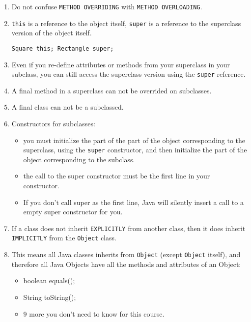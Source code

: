 \documentclass[a4paper, 9pt]{extarticle}
\begin{document}
\begin{enumerate}
  \item Do not confuse \verb+METHOD OVERRIDING+ with \verb+METHOD OVERLOADING+.

  \item \verb+this+ is a reference to the object itself, \verb+super+ is a
    reference to the superclass version of the object itself.

    \verb+Square this; Rectangle super;+

  \item Even if you re-define attributes or methods from your superclass in
    your subclass, you can still access the superclass version using the
    \verb+super+ reference.

  \item A final method in a superclass can not be overrided on subclasses.

  \item A final class can not be a subclassed.

  \item Constructors for subclasses:

    \begin{itemize}

      \item you must initialize the part of the part of the object
        corresponding to the superclass, using the \verb+super+ constructor,
        and then initialize the part of the object corresponding to the
        subclass.

      \item the call to the super constructor must be the first line in your
        constructor.

      \item If you don't call super as the first line, Java will silently
        insert a call to a empty super constructor for you.

    \end{itemize}

  \item If a class does not inherit \verb+EXPLICITLY+ from another class, then
    it does inherit \verb+IMPLICITLY+ from the \verb+Object+ class.

  \item This means all Java classes inherits from \verb+Object+ (except
    \verb+Object+ itself), and therefore all Java Objects have all the methods and
    attributes of an Object:

      \begin{itemize}

        \item boolean equals();

        \item String toString();

        \item 9 more you don't need to know for this course.

      \end{itemize}

\end{enumerate}
\end{document}
